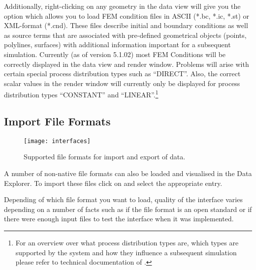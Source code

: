Additionally, right-clicking on any geometry in the data view will give you the option  which allows you to load FEM condition files in ASCII (*.bc, *.ic, *.st) or XML-format (*.cnd). These files describe initial and boundary conditions as well as source terms that are associated with pre-defined geometrical objects (points, polylines, surfaces) with additional information important for a subsequent simulation. Currently (as of version 5.1.02) most FEM Conditions will be correctly displayed in the data view and render window. Problems will arise with certain special process distribution types such as ``DIRECT''. Also, the correct scalar values in the render window will currently only be displayed for process distribution types ``CONSTANT'' and ``LINEAR''.\footnote{For an overview over what process distribution types are, which types are supported by the system and how they influence a subsequent simulation please refer to technical documentation of \ogs.}

\subsection{Import File Formats}

\begin{figure}[tb]
\begin{center}
\texttt{[image: interfaces]}
\caption{Supported file formats for import and export of data.}
\label{fig:interfaces}
\end{center}
\end{figure}

A number of non-native file formats can also be loaded and visualised in the Data Explorer. To import these files click on  and select the appropriate entry.

Depending of which file format you want to load, quality of the interface varies depending on a number of facts such as if the file format is an open standard or if there were enough input files to test the interface when it was implemented.

